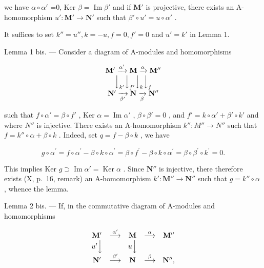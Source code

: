 we have \(\alpha\circ\alpha'\) =0, Ker \(\beta=\operatorname{Im}\beta'\) and if \(\mathbf{M}'\) is projective, there exists an A-homomorphism \(u':\mathbf{M}'\to\mathbf{N}'\) such that \(\beta'\circ u'=u\circ\alpha'\) .

It suffices to set \(k'' = u'', k = -u, f = 0, f' = 0\) and \(u' = k'\) in Lemma 1.

Lemma 1 bis. --- Consider a diagram of A-modules and homomorphisms

\[
\begin{array}{c} \mathbf {M} ^ {\prime} \xrightarrow {\alpha^ {\prime}} \mathbf {M} \xrightarrow {\alpha} \mathbf {M} ^ {\prime \prime} \\ \Big \downarrow_ {k ^ {\prime}} \Big \downarrow_ {f ^ {\prime}} \Big \downarrow_ {k} \Big \downarrow_ {f} \\ \mathbf {N} ^ {\prime} \xrightarrow [ \beta^ {\prime} ]{} \mathbf {N} \xrightarrow [ \beta ]{} \mathbf {N} ^ {\prime \prime} \end{array}
\]

such that \(f \circ \alpha' = \beta \circ f'\) , Ker \(\alpha = \operatorname{Im} \alpha'\) , \(\beta \circ \beta' = 0\) , and \(f' = k \circ \alpha' + \beta' \circ k'\) and where \(N''\) is injective. There exists an A-homomorphism \(k'' : M'' \to N''\) such that \(f = k'' \circ \alpha + \beta \circ k\) . Indeed, set \(q = f - \beta \circ k\) , we have

\[
g \circ \alpha^ {\prime} = f \circ \alpha^ {\prime} - \beta \circ k \circ \alpha^ {\prime} = \beta \circ f ^ {\prime} - \beta \circ k \circ \alpha^ {\prime} = \beta \circ \beta^ {\prime} \circ k ^ {\prime} = 0.
\]

This implies Ker \(g \supset \operatorname{Im} \alpha' = \operatorname{Ker} \alpha\) . Since \(\mathbf{N}''\) is injective, there therefore exists (X, p.~16, remark) an A-homomorphism \(k': \mathbf{M}'' \to \mathbf{N}''\) such that \(g = k'' \circ \alpha\) , whence the lemma.

Lemma 2 bis. --- If, in the commutative diagram of A-modules and homomorphisms

\[
\begin{array}{c c c c c} \mathbf {M} ^ {\prime} & \stackrel {{\alpha^ {\prime}}} {{\longrightarrow}} & \mathbf {M} & \stackrel {{\alpha}} {{\longrightarrow}} & \mathbf {M} ^ {\prime \prime} \\ u ^ {\prime} \Big \downarrow & & u \Big \downarrow & & \\ \mathbf {N} ^ {\prime} & \stackrel {{\beta^ {\prime}}} {{\longrightarrow}} & \mathbf {N} & \stackrel {{\beta}} {{\longrightarrow}} & \mathbf {N} ^ {\prime \prime}, \end{array}
\]

